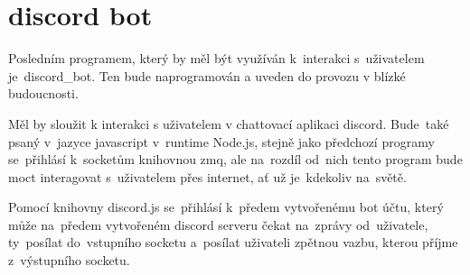 

\section{discord bot}

Posledním programem, který by měl být využíván k~interakci s~uživatelem je~discord\_bot. Ten bude naprogramován a uveden do provozu v blízké budoucnosti.

Měl by sloužit k interakci s uživatelem v chattovací aplikaci discord. Bude~také psaný v~jazyce javascript v~runtime Node.js, stejně jako předchozí programy se~přihlásí k~socketům knihovnou zmq, ale na~rozdíl od~nich tento program bude moct interagovat s~uživatelem přes internet, ať už je~kdekoliv na~světě.

Pomocí knihovny discord.js se~přihlásí k~předem vytvořenému bot účtu, který může na~předem vytvořeném discord serveru čekat na~zprávy od~uživatele, ty~posílat do~vstupního socketu a~posílat uživateli zpětnou vazbu, kterou příjme z~výstupního socketu.
